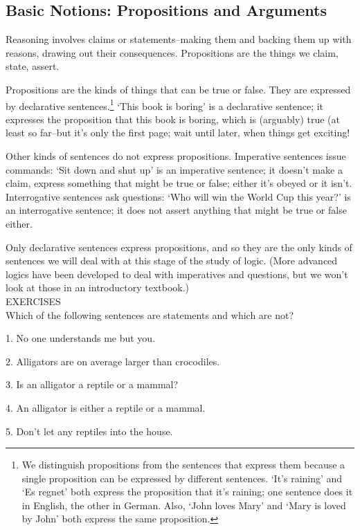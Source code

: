 \subsection{Basic Notions: Propositions and Arguments} 
Reasoning involves claims or 
statements--making them and backing them up with reasons, drawing out their consequences. 
Propositions are the things we claim, state, assert. 

Propositions are the kinds of things that can be 
true or false. They are expressed by declarative sentences.\footnote{We distinguish propositions from 
the sentences that express them because a single proposition can be expressed by different sentences. 
`It's raining' and `Es regnet' both express the proposition that it's raining; one sentence does it 
in English, the other in German. Also, `John loves Mary' and `Mary is loved by John' both express the 
same proposition.} `This book is boring' is a declarative sentence; it expresses the proposition that 
this book is boring, which is (arguably) true (at least so far--but it's only the first page; wait 
until later, when things get exciting! 

Other kinds of sentences do not express propositions. Imperative sentences issue 
commands: `Sit down and shut up' is an imperative sentence; it doesn't make a claim, express 
something that might be true or false; either it's obeyed or it isn't. Interrogative sentences ask 
questions: `Who will win the World Cup this year?' is an interrogative sentence; it does not assert 
anything that might be true or false either.

Only declarative sentences express propositions, and so they are the only kinds of sentences we
will deal with at this stage of the study of logic. (More advanced logics have been developed to
deal with imperatives and questions, but we won't look at those in an introductory textbook.) \\

EXERCISES \\

Which of the following sentences are statements and which are not?

1.  No one understands me but you.

2.  Alligators are on average larger than crocodiles.

3.  Is an alligator a reptile or a mammal?

4.  An alligator is either a reptile or a mammal.

5.  Don't let any reptiles into the house.

